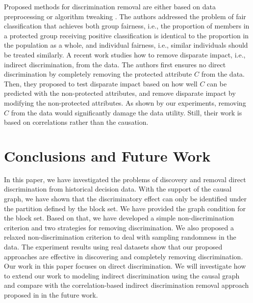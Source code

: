 \documentclass[twoside,leqno,twocolumn]{article}
\begin{document}
Proposed methods for discrimination removal are either based on data preprocessing \cite{kamiran2012data,zliobaite2011handling} or algorithm tweaking \cite{kamiran2010discrimination,calders2010three,kamishima2012fairness}. The authors \cite{dwork2012fairness} addressed the problem of fair classification that achieves both group fairness, i.e., the proportion of members in a protected group receiving positive classification is identical to the proportion in the population as a whole,  and individual fairness, i.e., similar individuals should be treated similarly. A recent work \cite{feldman2015certifying} studies how to remove disparate impact, i.e., indirect discrimination, from the data. The authors first ensures no direct discrimination by completely removing the protected attribute $C$ from the data. Then, they proposed to test disparate impact based on how well $C$ can be predicted with the non-protected attributes, and remove disparate impact by modifying the non-protected attributes. As shown by our experiments, removing $C$ from the data would significantly damage the data utility. Still, their work is based on correlations rather than the causation.

\section{Conclusions and Future Work}\label{sec:cc}
In this paper, we have investigated the problems of discovery and removal direct discrimination from historical decision data. With the support of the causal graph, we have shown that the discriminatory effect can only be identified under the partition defined by the block set. We have provided the graph condition for the block set. Based on that, we have developed a simple non-discrimination criterion and two strategies for removing discrimination. We also proposed a relaxed non-discrimination criterion to deal with sampling randomness in the data. The experiment results using real datasets show that our proposed approaches are effective in discovering and completely removing discrimination. Our work in this paper focuses on direct discrimination. We will investigate how to extend our work to modeling indirect discrimination using the causal graph and compare with the correlation-based indirect discrimination removal approach proposed in \cite{feldman2015certifying} in the future work.

\end{document}
